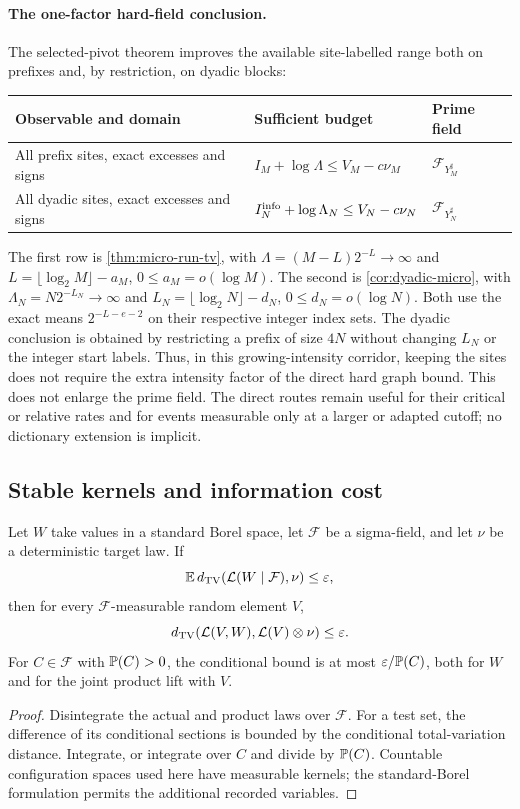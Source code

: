 \paragraph{The one-factor hard-field conclusion.}
The selected-pivot theorem improves the available site-labelled range
both on prefixes and, by restriction, on dyadic blocks:
\begin{center}\small
\begin{tabularx}{\textwidth}{@{}L{.29\textwidth}Xl@{}}\toprule
Observable and domain & Sufficient budget & Prime field\\\midrule
All prefix sites, exact excesses and signs &
$I_M+\log\Lambda\le V_M-c\nu_M$ & $\mathcal F_{Y_M^\sharp}$\\
All dyadic sites, exact excesses and signs &
$I_N^{\rm info}+\log\Lambda_N\le V_N-c\nu_N$ & $\mathcal F_{Y_N^\sharp}$\\\bottomrule
\end{tabularx}
\end{center}
The first row is \cref{thm:micro-run-tv}, with
$\Lambda=(M-L)2^{-L}\to\infty$ and
$L=\lfloor\log_2M\rfloor-a_M$, $0\le a_M=o(\log M)$.
The second is \cref{cor:dyadic-micro}, with
$\Lambda_N=N2^{-L_N}\to\infty$ and
$L_N=\lfloor\log_2N\rfloor-d_N$, $0\le d_N=o(\log N)$.
Both use the exact means $2^{-L-e-2}$ on their respective integer
index sets. The dyadic conclusion is obtained by restricting a prefix
of size $4N$ without changing $L_N$ or the integer start labels.
Thus, in this growing-intensity corridor, keeping the sites does not
require the extra intensity factor of the direct hard graph bound.
This does not enlarge the prime field. The direct routes remain useful
for their critical or relative rates and for events measurable only at
a larger or adapted cutoff; no dictionary extension is implicit.

\subsection{Stable kernels and information cost}
\begin{lemma}\label{lem:stable-lift}
Let $W$ take values in a standard Borel space, let $\mathcal F$ be a
sigma-field, and let $\nu$ be a deterministic target law. If
\[
 \mathbb E\,d_{\mathrm{TV}}(\mathcal L(W\mid\mathcal F),\nu)\le\varepsilon,
\]
then for every $\mathcal F$-measurable random element $V$,
\[
 d_{\mathrm{TV}}(\mathcal L(V,W),\mathcal L(V)\otimes\nu)\le\varepsilon.
\]
For $C\in\mathcal F$ with $\mathbb P(C)>0$, the conditional bound is at most
$\varepsilon/\mathbb P(C)$, both for $W$ and for the joint product lift with $V$.
\end{lemma}
\begin{proof}
Disintegrate the actual and product laws over $\mathcal F$. For a test set,
the difference of its conditional sections is bounded by the conditional
total-variation distance. Integrate, or integrate over $C$ and divide by
$\mathbb P(C)$. Countable configuration spaces used here have measurable kernels;
the standard-Borel formulation permits the additional recorded variables.
\end{proof}

